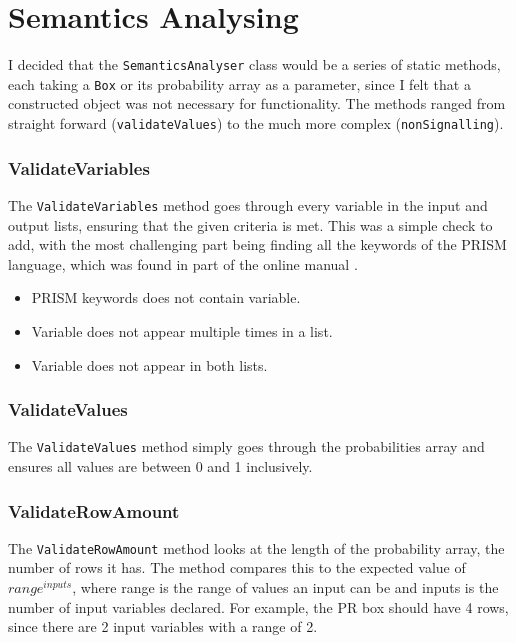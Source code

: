 \documentclass[report.tex]{subfiles}
\begin{document}
\section{Semantics Analysing} %
\label{sec:semantics_analysing}
I decided that the \texttt{SemanticsAnalyser} class would be a series of static
methods, each taking a \texttt{Box} or its probability array as a parameter,
since I felt that a constructed object was not necessary for functionality. The
methods ranged from straight forward (\texttt{validateValues}) to the much more
complex (\texttt{nonSignalling}).

\subsubsection{ValidateVariables} %
\label{ssub:validateVariables}
The \texttt{ValidateVariables} method goes through every variable in the input
and output lists, ensuring that the given criteria is met. This was a simple
check to add, with the most challenging part being finding all the keywords of
the PRISM language, which was found in part of the online manual
\cite{prism_keywords}.
\begin{itemize}
    \item PRISM keywords does not contain variable.
    \item Variable does not appear multiple times in a list.
    \item Variable does not appear in both lists.
\end{itemize}

\subsubsection{ValidateValues} %
\label{ssub:validatevalues}
The \texttt{ValidateValues} method simply goes through the probabilities array
and ensures all values are between 0 and 1 inclusively.

\subsubsection{ValidateRowAmount} %
\label{ssub:validaterowamount}
The \texttt{ValidateRowAmount} method looks at the length of the probability
array, the number of rows it has. The method compares this to the expected
value of \(range ^{inputs}\), where range is the range of values an input can be
and inputs is the number of input variables declared. For example, the PR box
should have 4 rows, since there are 2 input variables with a range of 2.
\end{document}
